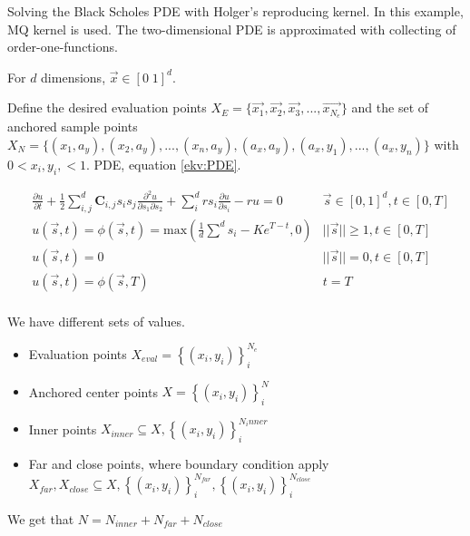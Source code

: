 \documentclass[a4paper]{article}      %
\begin{document}
Solving the Black Scholes PDE with Holger's reproducing kernel. In this example, MQ kernel is used. The two-dimensional PDE is approximated with collecting of order-one-functions. 

For $d$ dimensions, $\vec{x} \in [0\; 1]^d$.

Define the desired evaluation points $X_E = \bigl\{ \vec{x_1}, \vec{x_2}, \vec{x_3}, ..., \vec{x_{N_e}} \bigr\}$
and the set of anchored sample points  $X_N = \bigl\{ (x_1, a_y), (x_2, a_y),...,(x_n, a_y), (a_x, a_y), (a_x, y_1),...,(a_x, y_n) \bigr\}$
with $ 0 < x_i, y_i, < 1 $.
PDE, equation \ref{ekv:PDE}.

\begin{equation}
    \begin{aligned}
        &\frac{\partial u}{\partial t} + \frac{1}{2} \sum_{i, j}^d \mathbf{C}_{i,j} s_i s_j \frac{\partial^2 u}{\partial s_1 \partial s_2} + \sum_{i}^d r s_i \frac{\partial u}{\partial s_i} - ru = 0 \quad &\vec{s} \in [0,1]^d, t \in [0, T] \\
        &u(\vec{s},t) = \phi(\vec{s}, t) = \mathrm{max}(\frac{1}{d}\sum^d s_i - Ke^{T-t}, 0)    &||\vec{s}|| \geq 1, t \in [0, T] \\
        &u(\vec{s}, t) = 0 &||\vec{s}|| = 0, t \in [0, T] \\
        &u(\vec{s},t) = \phi(\vec{s},T) &t = T \\
    \end{aligned}
    \label{ekv:PDE}
\end{equation}

We have different sets of values.
\begin{itemize}
\item Evaluation points  $X_{eval} = \left\{ (x_i, y_i) \right\}_i ^ {N_e}$
\item Anchored center points $X = \left\{ (x_i, y_i) \right\}_i ^ {N}$ 
\item Inner points $X_{inner}\subseteq X,\left\{ (x_i, y_i) \right\}_i ^ {N_inner}$
\item Far and close points, where boundary condition apply
$X_{far}, X_{close} \subseteq X,\left\{ (x_i, y_i) \right\}_i ^ {N_{far}}, \left\{ (x_i, y_i) \right\}_i ^ {N_{close}}$
\end{itemize}
We get that $N = N_{inner} + N_{far} + N_{close}$
\end{document}
